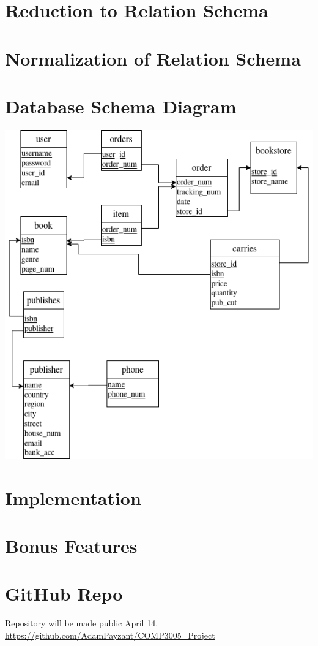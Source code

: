\documentclass[titlepage, oneside]{article}
\begin{document}
    \section{Reduction to Relation Schema}
    \section{Normalization of Relation Schema}
    \section{Database Schema Diagram}
        \begin{center}
            \includegraphics[scale=.7]{images/SchemaDiagram.png}
        \end{center}
    \section{Implementation}
    \section{Bonus Features}
    \section{GitHub Repo}
        Repository will be made public April 14. \\
        \url{https://github.com/AdamPayzant/COMP3005_Project}
\end{document}

